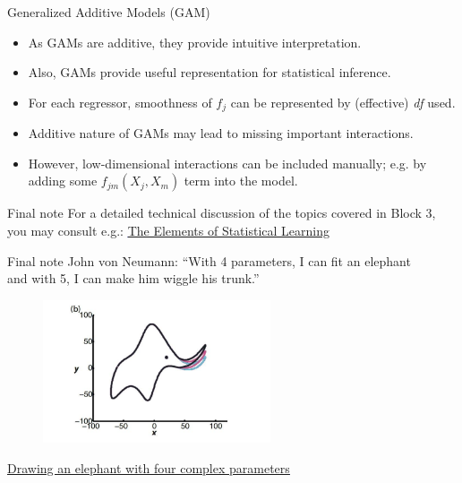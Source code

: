 \documentclass{beamer}
\begin{document}
\begin{frame}{Generalized Additive Models (GAM)}
\begin{itemize}
    \item[\ding{51}] As GAMs are additive, they provide intuitive interpretation. 
    \bigskip
    \item[\ding{51}] Also, GAMs provide useful representation for statistical inference.
    \bigskip
    \item[\ding{51}] For each regressor, smoothness of $f_j$ can be represented by (effective) \textit{df} used.
    \bigskip
    \item[\ding{55}] Additive nature of GAMs may lead to missing important interactions. 
    \bigskip 
    \item[\ding{51}] However, low-dimensional interactions can be included manually; e.g. by adding some $f_{jm}(X_j,X_m)$ term into the model.
\end{itemize}
\end{frame}
\begin{frame}{Final note}
\centering
For a detailed technical discussion of the topics covered in Block 3,\\ \medskip you may consult e.g.: \textcolor{blue}{\underline{\href{https://web.stanford.edu/~hastie/ElemStatLearn/}{The Elements of Statistical Learning}}}
\end{frame}
\begin{frame}[noframenumbering]{Final note }
John von Neumann: ``With 4 parameters, I can fit an elephant\\ and with 5, I can make him wiggle his trunk.''
\begin{figure}
  \includegraphics[width=0.6\textwidth]{IMG/Elephant.jpg}
\end{figure}
\centering
\textcolor{blue}{\underline{\href{https://fermatslibrary.com/s/drawing-an-elephant-with-four-complex-parameters}{Drawing an elephant with four complex parameters}}}
\end{frame}
\end{document}

